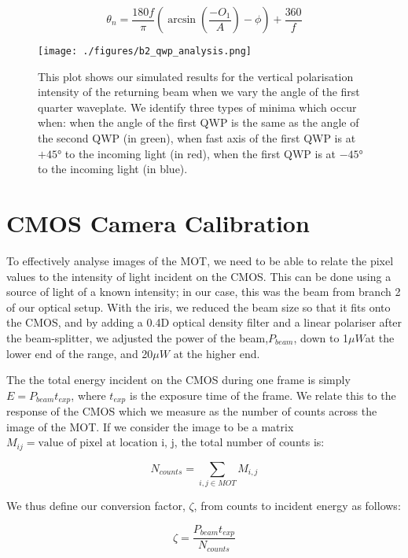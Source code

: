 \documentclass[12pt,twoside]{article}
\begin{document}
\begin{equation}
\theta_n=\frac{180f}{\pi}\left(\arcsin{\left(\frac{-O_1}{A}\right)}-\phi\right) + \frac{360}{f}
\end{equation}


\begin{figure}[h]
    \centering
    \texttt{[image: ./figures/b2\_qwp\_analysis.png]}
    \caption{This plot shows our simulated results for the vertical polarisation intensity of the returning beam when we vary the angle of the first quarter waveplate. We identify three types of minima which occur when: when the angle of the first QWP is the same as the angle of the second QWP (in green), when fast axis of the first QWP is at $+45$° to the incoming light (in red), when the first QWP is at $-45$° to the incoming light (in blue).}
    \label{fig:b2_qwp}
\end{figure}


\section{CMOS Camera Calibration}
\hspace{10pt} To effectively analyse images of the MOT, we need to be able to relate the pixel values to the intensity of light incident on the CMOS. This can be done using a source of light of a known intensity; in our case, this was the beam from branch 2 of our optical setup. With the iris, we reduced the beam size so that it fits onto the CMOS, and by adding a 0.4D optical density filter and a linear polariser after the beam-splitter, we adjusted the power of the beam,$P_{beam}$, down to 1$\mu W$at the lower end of the range, and 20$\mu W$ at the higher end.

The the total energy incident on the CMOS during one frame is simply $E=P_{beam}t_{exp}$, where $t_{exp}$ is the exposure time of the frame. We relate this to the response of the CMOS which we measure as the number of counts across the image of the MOT. If we consider the image to be a matrix $M_{ij}=\text{value of pixel at location i, j}$, the total number of counts is:

\begin{equation}
N_{counts}=\sum_{i,j\in MOT}M_{i,j} \label{eqn: camera total counts}
\end{equation}

We thus define our conversion factor, $\zeta$, from counts to incident energy as follows:

\begin{equation}
\zeta = \frac{P_{beam}t_{exp}}{N_{counts}} \label{eqn: camera conversion factor}
\end{equation}
\end{document}

